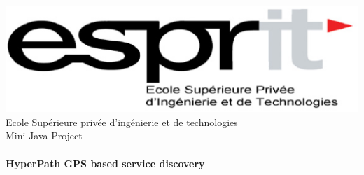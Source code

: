 
\begin{titlepage}
  \begin{center}
    \includegraphics[scale=0.6]{Figures/Esprit_logo}
    \\[1cm]

    {
      \textsc\LARGE
      Ecole Supérieure privée d'ingénierie et de technologies
    }
    \\[1cm]

    {
      \textsc\Large
      Mini Java Project
    }
    \\[0.5cm]
    \HRule
    \\[0.5cm]

    {
      \huge\bfseries
      HyperPath GPS based service discovery
    }
    \\[0.5cm]
    \HRule
    \\[1.5cm]


\end{center}
\end{titlepage}
